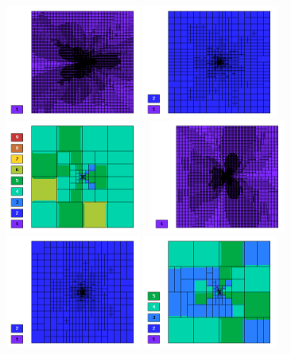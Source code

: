 \documentclass[12pt]{elsarticle}
\begin{document}
\begin{figure}[H]
\centering
\vspace{-3mm}
\includegraphics[height=3.7cm]{nist/nist-3/mesh_u_h1_aniso.png}
\includegraphics[height=3.7cm]{nist/nist-3/mesh_u_h2_aniso.png}
\includegraphics[height=3.7cm]{nist/nist-3/mesh_u_hp_anisoh.png}\ \
\includegraphics[height=3.7cm]{nist/nist-3/mesh_v_h1_aniso.png}
\includegraphics[height=3.7cm]{nist/nist-3/mesh_v_h2_aniso.png}
\includegraphics[height=3.7cm]{nist/nist-3/mesh_v_hp_anisoh.png}

\end{figure}
\end{document}
